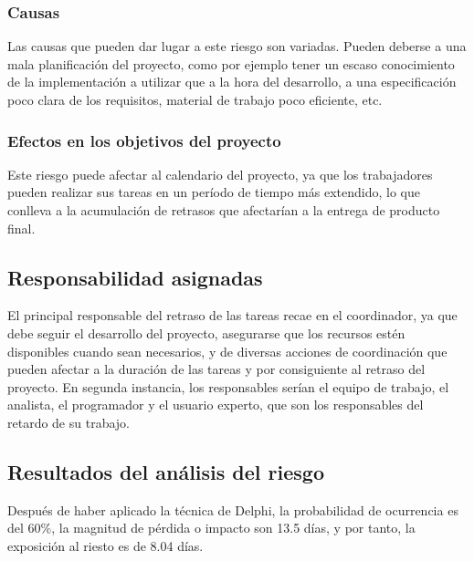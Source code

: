 \documentclass[11pt,a4paper,spanish,twoside]{report}
\begin{document}
\subsubsection{Causas}
Las causas que pueden dar lugar a este riesgo son variadas. Pueden deberse a una mala
planificación del proyecto, como por ejemplo tener un escaso conocimiento de
la implementación a utilizar que a la hora del desarrollo, a una especificación
poco clara de los requisitos, material de trabajo poco eficiente, etc.

\subsubsection{Efectos en los objetivos del proyecto}
Este riesgo puede afectar al calendario del proyecto, ya que los trabajadores
pueden realizar sus tareas en un período de tiempo más extendido, lo que
conlleva a la acumulación de retrasos que afectarían a la entrega
de producto final.

\subsection{Responsabilidad asignadas}
El principal responsable del retraso de las tareas recae en el coordinador, ya que
debe seguir el desarrollo del proyecto, asegurarse que los recursos estén
disponibles cuando sean necesarios, y de diversas acciones de coordinación
que pueden afectar a la duración de las tareas y por consiguiente al retraso
del proyecto. En segunda instancia, los responsables serían el equipo de
trabajo, el analista, el programador y el usuario experto, que son los
responsables del retardo de su trabajo.

\subsection{Resultados del análisis del riesgo}
Después de haber aplicado la técnica de Delphi, la probabilidad de ocurrencia
es del 60\%, la magnitud de pérdida o impacto son 13.5 días, y por tanto, la
exposición al riesto es de  8.04 días.
\end{document}
